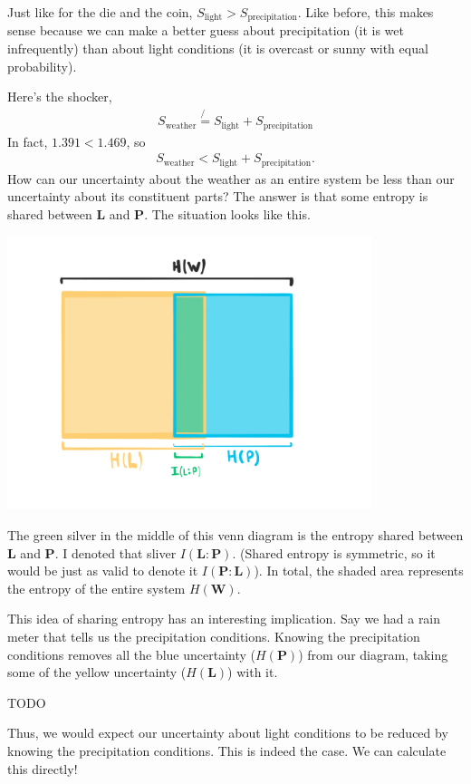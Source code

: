 Just like for the die and the coin, $S_{\text{light}} > S_{\text{precipitation}}$.
Like before, this makes sense because we can make a better guess about precipitation (it is wet infrequently) than about light conditions (it is overcast or sunny with equal probability).

Here's the shocker,
\begin{align*}
S_{\text{weather}}
\not{=}
S_{\text{light}} + S_{\text{precipitation}}
\end{align*}
In fact, $1.391 < 1.469$, so
\begin{align*}
S_{\text{weather}}
<
S_{\text{light}} + S_{\text{precipitation}}.
\end{align*}
How can our uncertainty about the weather as an entire system be less than our uncertainty about its constituent parts?
The answer is that some entropy is shared between $\bm{L}$ and $\bm{P}$.
The situation looks like this.
\begin{center}
  \includegraphics[trim= 0 0 0 0, clip, width=0.8\textwidth]{img/venn}
\end{center}
The green silver in the middle of this venn diagram is the entropy shared between $\bm{L}$ and $\bm{P}$.
I denoted that sliver $I( \bm{L} : \bm{P})$.
(Shared entropy is symmetric, so it would be just as valid to denote it $I( \bm{P} : \bm{L})$).
In total, the shaded area represents the entropy of the entire system $H(\bm{W})$.

This idea of sharing entropy has an interesting implication.
Say we had a rain meter that tells us the precipitation conditions.
Knowing the precipitation conditions removes all the blue uncertainty ($H(\bm{P})$) from our diagram, taking some of the yellow uncertainty ($H(\bm{L})$) with it.
\begin{center}
TODO
\end{center}
Thus, we would expect our uncertainty about light conditions to be reduced by knowing the precipitation conditions.
This is indeed the case.
We can calculate this directly!

